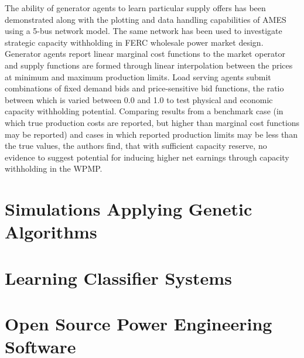 The ability of generator agents to learn particular supply offers has been
demonstrated along with the plotting and data handling capabilities of AMES
using a 5-bus network model\cite{tesfatsi:pes09}.  The same network has been
used to investigate strategic capacity withholding in FERC wholesale power
market design\cite{tesfasi:psce}.  Generator agents report linear marginal cost
functions to the market operator and supply functions are formed through linear
interpolation between the prices at minimum and maximum production limits.
Load serving agents submit combinations of fixed demand bids and
price-sensitive bid functions, the ratio between which is varied between 0.0 and
1.0 to test physical and economic capacity withholding potential.  Comparing
results from a benchmark case (in which true production costs are reported,
but higher than marginal cost functions may be reported) and cases in which
reported production limits may be less than the true values, the authors find,
that with sufficient capacity reserve, no evidence to suggest potential for
inducing higher net earnings through capacity withholding in the WPMP.


\section{Simulations Applying Genetic Algorithms}
\section{Learning Classifier Systems}



\section{Open Source Power Engineering Software}
